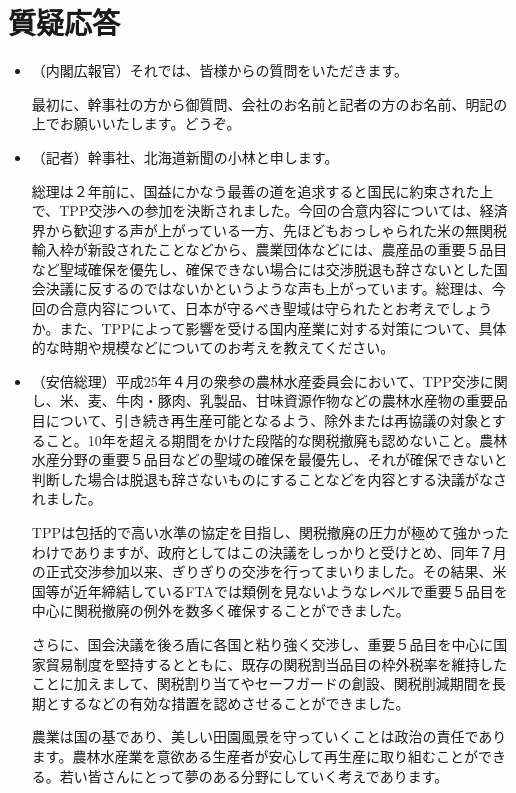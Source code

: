 \section {質疑応答}
\begin {itemize}
\item （内閣広報官）それでは、皆様からの質問をいただきます。\par
  最初に、幹事社の方から御質問、会社のお名前と記者の方のお名前、明記の上でお願いいたします。どうぞ。\par
\item （記者）幹事社、北海道新聞の小林と申します。\par
  総理は２年前に、国益にかなう最善の道を追求すると国民に約束された上で、TPP交渉への参加を決断されました。今回の合意内容については、経済界から歓迎する声が上がっている一方、先ほどもおっしゃられた米の無関税輸入枠が新設されたことなどから、農業団体などには、農産品の重要５品目など聖域確保を優先し、確保できない場合には交渉脱退も辞さないとした国会決議に反するのではないかというような声も上がっています。総理は、今回の合意内容について、日本が守るべき聖域は守られたとお考えでしょうか。また、TPPによって影響を受ける国内産業に対する対策について、具体的な時期や規模などについてのお考えを教えてください。\par
\item （安倍総理）平成25年４月の衆参の農林水産委員会において、TPP交渉に関し、米、麦、牛肉・豚肉、乳製品、甘味資源作物などの農林水産物の重要品目について、引き続き再生産可能となるよう、除外または再協議の対象とすること。10年を超える期間をかけた段階的な関税撤廃も認めないこと。農林水産分野の重要５品目などの聖域の確保を最優先し、それが確保できないと判断した場合は脱退も辞さないものにすることなどを内容とする決議がなされました。\par
  TPPは包括的で高い水準の協定を目指し、関税撤廃の圧力が極めて強かったわけでありますが、政府としてはこの決議をしっかりと受けとめ、同年７月の正式交渉参加以来、ぎりぎりの交渉を行ってまいりました。その結果、米国等が近年締結しているFTAでは類例を見ないようなレベルで重要５品目を中心に関税撤廃の例外を数多く確保することができました。\par
  さらに、国会決議を後ろ盾に各国と粘り強く交渉し、重要５品目を中心に国家貿易制度を堅持するとともに、既存の関税割当品目の枠外税率を維持したことに加えまして、関税割り当てやセーフガードの創設、関税削減期間を長期とするなどの有効な措置を認めさせることができました。\par
  農業は国の基であり、美しい田園風景を守っていくことは政治の責任であります。農林水産業を意欲ある生産者が安心して再生産に取り組むことができる。若い皆さんにとって夢のある分野にしていく考えであります。\par

\end{itemize}
